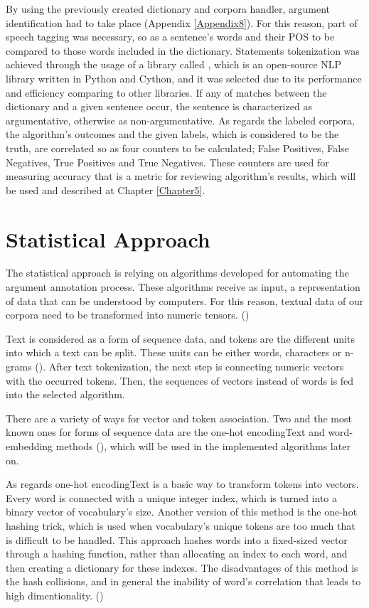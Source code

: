 By using the previously created dictionary and corpora handler, argument identification had to take place (Appendix \ref{Appendix8}). For this reason, part of speech tagging was necessary, so as a sentence's words and their POS to be compared to those words included in the dictionary. Statements tokenization was achieved through the usage of a library called \cite{spaCy}, which is an open-source NLP library written in Python and Cython, and it was selected due to its performance and efficiency comparing to other libraries. If any of matches between the dictionary and a given sentence occur, the sentence is characterized as argumentative, otherwise as non-argumentative. As regards the labeled corpora, the algorithm's outcomes and the given labels, which is considered to be the truth, are correlated so as four counters to be calculated; False Positives, False Negatives, True Positives and True Negatives. These counters are used for measuring accuracy that is a metric for reviewing algorithm's results, which will be used and described at Chapter \ref{Chapter5}. \par

\section{Statistical Approach}

The statistical approach is relying on algorithms developed for automating the argument annotation process. These algorithms receive as input, a representation of data that can be understood by computers. For this reason, textual data of our corpora need to be transformed into numeric tensors. (\cite{Chollet2017}) \par

Text is considered as a form of sequence data, and tokens are the different units into which a text can be split. These units can be either words, characters or n-grams (\cite{Chollet2017}). After text tokenization, the next step is connecting numeric vectors with the occurred tokens. Then, the sequences of vectors instead of words is fed into the selected algorithm. \par

There are a variety of ways for vector and token association. Two and the most known ones for forms of sequence data are the one-hot encodingText and word-embedding methods (\cite{Chollet2017}), which will be used in the implemented algorithms later on. 

As regards one-hot encodingText is a basic way to transform tokens into vectors. Every word is connected with a unique integer index, which is turned into a binary vector of vocabulary's size. Another version of this method is the one-hot hashing trick, which is used when vocabulary's unique tokens are too much that is difficult to be handled. This approach hashes words into a fixed-sized vector through a hashing function, rather than allocating an index to each word, and then creating a dictionary for these indexes. The disadvantages of this method is the hash collisions, and in general the inability of word's correlation that leads to high dimentionality. (\cite{Chollet2017})

